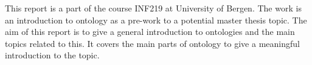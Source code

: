 This report is a part of the course INF219 at University of Bergen. The work is an introduction to ontology as a pre-work to a potential master thesis topic. The aim of this report is to give a general introduction to ontologies and the main topics related to this. It covers the main parts of ontology to give a meaningful introduction to the topic.